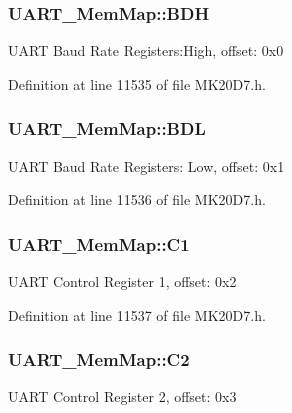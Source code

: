 \subsubsection[{\texorpdfstring{B\+DH}{BDH}}]{ U\+A\+R\+T\+\_\+\+Mem\+Map\+::\+B\+DH}\hypertarget{struct_u_a_r_t___mem_map_a50621a015b23211a706aa74180fa4689}{}\label{struct_u_a_r_t___mem_map_a50621a015b23211a706aa74180fa4689}
U\+A\+RT Baud Rate Registers\+:High, offset\+: 0x0 

Definition at line 11535 of file M\+K20\+D7.\+h.

\subsubsection[{\texorpdfstring{B\+DL}{BDL}}]{ U\+A\+R\+T\+\_\+\+Mem\+Map\+::\+B\+DL}\hypertarget{struct_u_a_r_t___mem_map_ac846186ffd0e53fbac32cd57c6f9acc4}{}\label{struct_u_a_r_t___mem_map_ac846186ffd0e53fbac32cd57c6f9acc4}
U\+A\+RT Baud Rate Registers\+: Low, offset\+: 0x1 

Definition at line 11536 of file M\+K20\+D7.\+h.

\subsubsection[{\texorpdfstring{C1}{C1}}]{ U\+A\+R\+T\+\_\+\+Mem\+Map\+::\+C1}\hypertarget{struct_u_a_r_t___mem_map_ac2300c7c40e63ca712d0ec5180332f4b}{}\label{struct_u_a_r_t___mem_map_ac2300c7c40e63ca712d0ec5180332f4b}
U\+A\+RT Control Register 1, offset\+: 0x2 

Definition at line 11537 of file M\+K20\+D7.\+h.

\subsubsection[{\texorpdfstring{C2}{C2}}]{ U\+A\+R\+T\+\_\+\+Mem\+Map\+::\+C2}\hypertarget{struct_u_a_r_t___mem_map_a3e49aeb27f3613fd01a17a3c76e785b7}{}\label{struct_u_a_r_t___mem_map_a3e49aeb27f3613fd01a17a3c76e785b7}
U\+A\+RT Control Register 2, offset\+: 0x3 


